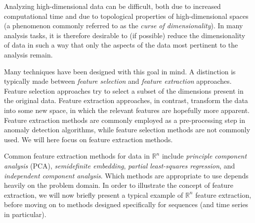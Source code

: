 Analyzing high-dimensional data can be difficult, both due to increased computational time and due to topological properties of high-dimensional spaces (a phenomenon commonly referred to as the \emph{curse of dimensionality}). In many analysis tasks, it is therefore desirable to (if possible) reduce the dimensionality of data in such a way that only the aspects of the data most pertinent to the analysis remain.

Many techniques have been designed with this goal in mind. A distinction is typically made between \emph{feature selection} and \emph{feature extraction} approaches. Feature selection approaches try to select a subset of the dimensions present in the original data. Feature extraction approaches, in contrast, transform the data into some new space, in which the relevant features are hopefully more apparent. Feature extraction methods are commonly employed as a pre-processing step in anomaly detection algorithms, while feature selection methods are not commonly used. We will here focus on feature extraction methods.

Common feature extraction methods for data in $\mathbb{R}^n$ include \emph{principle component analysis} (PCA), \emph{semidefinite embedding}, \emph{partial least-squares regression}, and \emph{independent component analysis}. Which methods are appropriate to use depends heavily on the problem domain. In order to illustrate the concept of feature extraction, we will now briefly present a typical example of $\mathbb{R}^n$ feature extraction, before moving on to methods designed specifically for sequences (and time series in particular).


